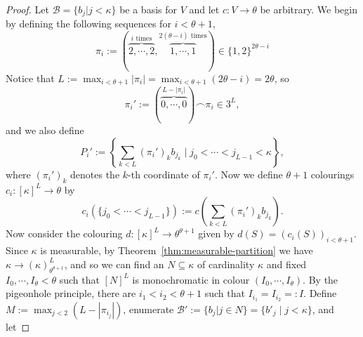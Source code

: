 \documentclass[10pt,a4paper]{amsart}
\theoremstyle{definition}
\theoremstyle{remark}
\numberwithin{equation}{section}
\begin{document}
    \begin{proof}
        Let $\mathcal{B}=\{b_{j}|j<\kappa\}$ be a basis for $V$ and let $c:V\longrightarrow\theta$ be arbitrary. We begin by defining the following sequences for $i<\theta+1$,
        \begin{equation*}
            \pi_{i}:=(\overbrace{2,\cdots,2}^{i\text{ times}},\overbrace{1,\cdots,1}^{2(\theta-i)\text{ times}})\in\{1,2\}^{2\theta-i}
        \end{equation*}
        Notice that $L:=\max_{i<\theta+1}|\pi_{i}|=\max_{i<\theta+1}(2\theta-i)=2\theta$, so
        \begin{equation*}
            \pi_{i}':=(\overbrace{0,\cdots,0}^{L-|\pi_{i}|})\frown\pi_{i}\in3^{L},
        \end{equation*}
        and we also define
         \begin{equation*}
             P_{i}':=\left\{\sum_{k<L}(\pi_{i}')_{k}b_{j_{k}}\;\Big|\;j_{0}<\cdots<j_{L-1}<\kappa\right\},
         \end{equation*}
        where $(\pi_{i}')_{k}$ denotes the $k$-th coordinate of $\pi_{i}'$. Now we define $\theta+1$ colourings $ c_{i}:[\kappa]^{L}\longrightarrow\theta$ by
        \begin{equation*}
            c_i(\{j_{0}<\cdots<j_{L-1}\}):=            c\left(\sum_{k<L}(\pi_{i}')_{k} b_{j_{k}}\right).
        \end{equation*}
        Now consider the colouring $d:[\kappa]^{L}\longrightarrow\theta^{\theta+1}$ given by $d(S)=(c_{i}(S))_{i<\theta+1}$. Since $\kappa$ is measurable, by Theorem~\ref{thm:measurable-partition} we have $\kappa\to(\kappa)^{L}_{\theta^{\theta+1}}$, and so we can find an $N\subseteq\kappa$ of cardinality $\kappa$ and fixed $I_{0},\cdots,I_{\theta}<\theta$ such that $[N]^L$ is monochromatic in colour $(I_{0},\cdots,I_{\theta})$. By the pigeonhole principle, there are  $i_{1}<i_{2}<\theta+1$ such that $I_{i_{1}}=I_{i_{2}}=:I$. Define $M:=\max_{j<2}(L-|\pi_{i_{j}}|)$, enumerate $\mathcal{B}':=\{b_j\big|j\in N\}=\{b'_{j}\mid j<\kappa\}$, and let 

\end{proof}
\end{document}
